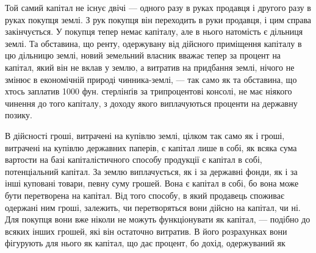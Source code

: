 Той самий капітал не існує двічі — одного разу в руках продавця і другого
разу в руках покупця землі. З рук покупця він переходить в руки продавця,
і цим справа закінчується. У покупця тепер немає капіталу, але в нього
натомість є дільниця землі. Та обставина, що ренту, одержувану від дійсного
приміщення капіталу в цю дільницю землі, новий земельний власник вважає
тепер за процент на капітал, який він не вклав у землю, а витратив на придбання
землі, нічого не змінює в економічній природі чинника-землі, — так само
як та обставина, що хтось заплатив 1000 фун. стерлінґів за трипроцентові консолі,
не має ніякого чинення до того капіталу, з доходу якого виплачуються проценти
на державну позику.

В дійсності гроші, витрачені на купівлю землі, цілком так само як і
гроші, витрачені на купівлю державних паперів, є капітал лише в собі, як
всяка сума вартости на базі капіталістичного способу продукції є капітал в собі,
потенціальний капітал. За землю виплачується, як і за державні фонди, як і
за інші куповані товари, певну суму грошей. Вона є капітал в собі, бо вона
може бути перетворена на капітал. Від того способу, в який продавець споживає
одержані ним гроші, залежить, чи перетворяться вони дійсно на капітал, чи ні.
Для покупця вони вже ніколи не можуть функціонувати як капітал, — подібно
до всяких інших грошей, які він остаточно витратив. В його розрахунках вони
фігурують для нього як капітал, що дає процент, бо дохід, одержуваний як
\parbreak{}  %

